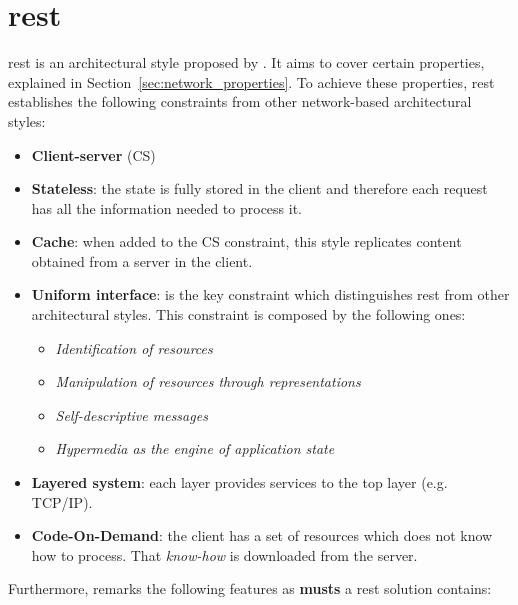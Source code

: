 
\section{\acl{rest}}

\acf{rest} is an architectural style proposed by \citet{fielding_architectural_2000}.
It aims to cover certain properties, explained in Section~\ref{sec:network_properties}.
To achieve these properties, \ac{rest} establishes the following constraints from other network-based architectural styles:
\begin{itemize}
 \item \textbf{Client-server} (CS)
 \item \textbf{Stateless}: the state is fully stored in the client and therefore each request has all the information needed to process it.
 \item \textbf{Cache}: when added to the CS constraint, this style replicates content obtained from a server in the client.
 \item \textbf{Uniform interface}: is the key constraint which distinguishes \ac{rest} from other architectural styles.
                   This constraint is composed by the following ones:
	\begin{itemize}
	  \item \emph{Identification of resources}
	  \item \emph{Manipulation of resources through representations}
	  \item \emph{Self-descriptive messages}
	  \item \emph{Hypermedia as the engine of application state}
	\end{itemize}
 \item \textbf{Layered system}: each layer provides services to the top layer (e.g. TCP/IP). %
 \item \textbf{Code-On-Demand}: the client has a set of resources which does not know how to process.
       That \emph{know-how} is downloaded from the server.
\end{itemize}


Furthermore, \citeauthor{fielding_architectural_2000} remarks the following features as \textbf{musts} a \ac{rest} solution contains\citep{fielding_rest_2008}:

